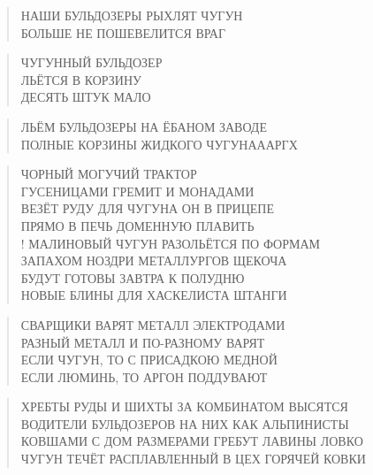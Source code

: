 \poemtitle{***}
\begin{verse}
НАШИ БУЛЬДОЗЕРЫ РЫХЛЯТ ЧУГУН\\
БОЛЬШЕ НЕ ПОШЕВЕЛИТСЯ ВРАГ
\end{verse}

\poemtitle{***}
\begin{verse}
ЧУГУННЫЙ БУЛЬДОЗЕР\\
ЛЬЁТСЯ В КОРЗИНУ\\
ДЕСЯТЬ ШТУК МАЛО
\end{verse}

\poemtitle{***}
\begin{verse}
ЛЬЁМ БУЛЬДОЗЕРЫ НА ЁБАНОМ ЗАВОДЕ\\
ПОЛНЫЕ КОРЗИНЫ ЖИДКОГО ЧУГУНАААРГХ
\end{verse}

\poemtitle{***}
\begin{verse}
ЧОРНЫЙ МОГУЧИЙ ТРАКТОР\\
ГУСЕНИЦАМИ ГРЕМИТ И МОНАДАМИ\\
ВЕЗЁТ РУДУ ДЛЯ ЧУГУНА ОН В ПРИЦЕПЕ\\
ПРЯМО В ПЕЧЬ ДОМЕННУЮ ПЛАВИТЬ\\!
МАЛИНОВЫЙ ЧУГУН РАЗОЛЬЁТСЯ ПО ФОРМАМ\\
ЗАПАХОМ НОЗДРИ МЕТАЛЛУРГОВ ЩЕКОЧА\\
БУДУТ ГОТОВЫ ЗАВТРА К ПОЛУДНЮ\\
НОВЫЕ БЛИНЫ ДЛЯ ХАСКЕЛИСТА ШТАНГИ
\end{verse}

\poemtitle{***}
\begin{verse}
СВАРЩИКИ ВАРЯТ МЕТАЛЛ ЭЛЕКТРОДАМИ\\
РАЗНЫЙ МЕТАЛЛ И ПО-РАЗНОМУ ВАРЯТ\\
ЕСЛИ ЧУГУН, ТО С ПРИСАДКОЮ МЕДНОЙ\\
ЕСЛИ ЛЮМИНЬ, ТО АРГОН ПОДДУВАЮТ
\end{verse}

\poemtitle{***}
\begin{verse}
ХРЕБТЫ РУДЫ И ШИХТЫ ЗА КОМБИНАТОМ ВЫСЯТСЯ\\
ВОДИТЕЛИ БУЛЬДОЗЕРОВ НА НИХ КАК АЛЬПИНИСТЫ\\
КОВШАМИ С ДОМ РАЗМЕРАМИ ГРЕБУТ ЛАВИНЫ ЛОВКО\\
ЧУГУН ТЕЧЁТ РАСПЛАВЛЕННЫЙ В ЦЕХ ГОРЯЧЕЙ КОВКИ
\end{verse}

